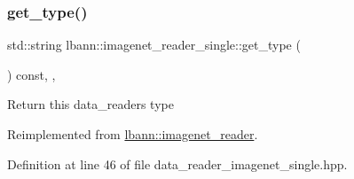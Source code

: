 \subsubsection{\texorpdfstring{get\+\_\+type()}{get\_type()}}
{\footnotesize\ttfamily std\+::string lbann\+::imagenet\+\_\+reader\+\_\+single\+::get\+\_\+type (\begin{DoxyParamCaption}{ }\end{DoxyParamCaption}) const\hspace{0.3cm}{\ttfamily [inline]}, {\ttfamily [override]}, {\ttfamily [virtual]}}

Return this data\+\_\+reader\textquotesingle{}s type 

Reimplemented from \hyperlink{classlbann_1_1imagenet__reader_a0afea0db8b4286b56211842f8f1d7678}{lbann\+::imagenet\+\_\+reader}.



Definition at line 46 of file data\+\_\+reader\+\_\+imagenet\+\_\+single.\+hpp.


